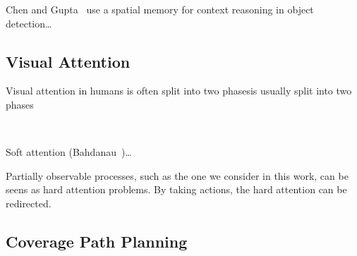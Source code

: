 Chen and Gupta~\cite{chen_memory_2017} use a spatial memory for context reasoning in object detection\dots

\subsection{Visual Attention}

Visual attention in humans is often split into two phasesis usually split into two phases

~\cite{itti_koch_2001}





\cite{minut_mahadevan_2001}

\cite{mnih_attention_2014}

Soft attention (Bahdanau~\cite{bahdanau_attention_2016})\dots

Partially observable processes, such as the one we consider in this work, can be seens as hard attention problems.
By taking actions, the hard attention can be redirected.


\subsection{Coverage Path Planning}


